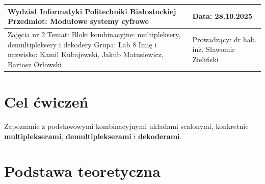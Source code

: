 \documentclass{article}
\begin{document}
\begin{center}
    
    \begin{tabular}{|p{}|p{}|}
        \hline
        
        
        Wydział Informatyki Politechniki Białostockiej \newline
        Przedmiot: Modułowe systemy cyfrowe
        & 
        Data: 28.10.2025 \\
        
        \hline %
        
        
        Zajęcia nr 2 \newline
        Temat: Bloki kombinacyjne: multipleksery, demultipleksery i dekodery \newline
        \vspace{1em} %
        Grupa: Lab 8 \newline
        Imię i nazwisko: \newline
        Kamil Kubajewski, Jakub Matusiewicz, Bartosz Orłowski
        & 
        Prowadzący: \newline
        dr hab. inż. Sławomir Zieliński \\
        
        \hline
    \end{tabular}
\end{center}

\section{Cel ćwiczeń}

Zapoznanie z podstawowymi kombinacyjnymi układami scalonymi, konkretnie \textbf{multiplekserami}, \textbf{demultiplekserami} i \textbf{dekoderami}.

\section{Podstawa teoretyczna}
\end{document}
